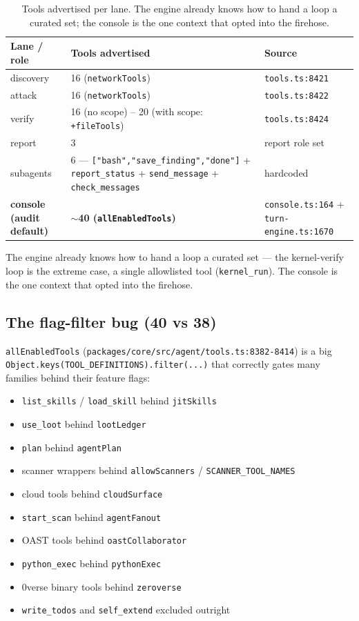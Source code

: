 \documentclass[11pt]{article}
\begin{document}
\begin{table}[ht]
\centering
\small
\begin{tabular}{lll}
\toprule
Lane / role & Tools advertised & Source \\
\midrule
discovery & 16 (\texttt{networkTools}) & \texttt{tools.ts:8421} \\
attack & 16 (\texttt{networkTools}) & \texttt{tools.ts:8422} \\
verify & 16 (no scope) -- 20 (with scope: \texttt{+fileTools}) & \texttt{tools.ts:8424} \\
report & 3 & report role set \\
subagents & 6 --- \texttt{["bash","save\_finding","done"]} + \texttt{report\_status} + \texttt{send\_message} + \texttt{check\_messages} & hardcoded \\
\textbf{console (audit default)} & \textbf{$\sim$40 (\texttt{allEnabledTools})} & \texttt{console.ts:164} + \texttt{turn-engine.ts:1670} \\
\bottomrule
\end{tabular}
\caption{Tools advertised per lane. The engine already knows how to hand a loop a curated set; the console is the one context that opted into the firehose.}
\label{tab:lanes}
\end{table}

The engine already knows how to hand a loop a curated set --- the kernel-verify
loop is the extreme case, a single allowlisted tool (\texttt{kernel\_run}). The
console is the one context that opted into the firehose.

\subsection{The flag-filter bug (40 vs 38)}

\texttt{allEnabledTools} (\texttt{packages/core/src/agent/tools.ts:8382-8414})
is a big \texttt{Object.keys(TOOL\_DEFINITIONS).filter(...)} that correctly gates
many families behind their feature flags:

\begin{itemize}[leftmargin=*]
  \item \texttt{list\_skills} / \texttt{load\_skill} behind \texttt{jitSkills}
  \item \texttt{use\_loot} behind \texttt{lootLedger}
  \item \texttt{plan} behind \texttt{agentPlan}
  \item scanner wrappers behind \texttt{allowScanners} / \texttt{SCANNER\_TOOL\_NAMES}
  \item cloud tools behind \texttt{cloudSurface}
  \item \texttt{start\_scan} behind \texttt{agentFanout}
  \item OAST tools behind \texttt{oastCollaborator}
  \item \texttt{python\_exec} behind \texttt{pythonExec}
  \item 0verse binary tools behind \texttt{zeroverse}
  \item \texttt{write\_todos} and \texttt{self\_extend} excluded outright
\end{itemize}
\end{document}
